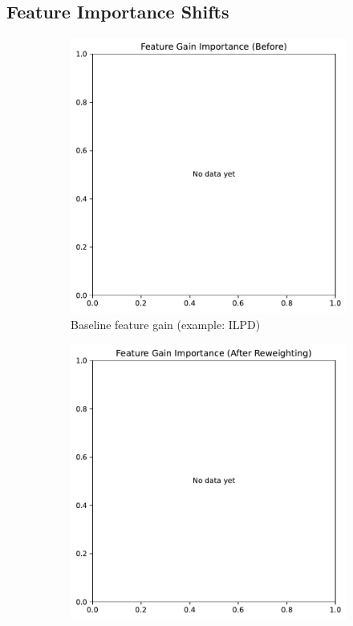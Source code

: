 \documentclass[sn-basic]{sn-jnl} %
\begin{document}
\subsection{Feature Importance Shifts}
\begin{figure}[H]
  \centering
  \begin{subfigure}{.49\linewidth}
    \centering
    \includegraphics[width=\linewidth]{fig_feat_gain_before.pdf}
    \caption{Baseline feature gain (example: ILPD)}
  \end{subfigure}\hfill
  \begin{subfigure}{.49\linewidth}
    \centering
    \includegraphics[width=\linewidth]{fig_feat_gain_after.pdf}

\end{subfigure}
\end{figure}
\end{document}
